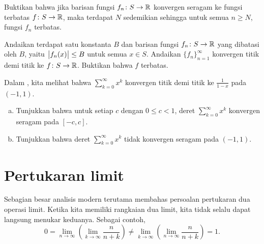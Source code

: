 \begin{exercise}
Buktikan bahwa
jika barisan fungsi $f_n \colon S \to {\mathbb{R}}$
konvergen seragam ke fungsi terbatas $f \colon S \to {\mathbb{R}}$,
maka terdapat $N$ sedemikian sehingga untuk semua $n \geq N$, fungsi $f_n$
terbatas.
\end{exercise}

\begin{exercise}
Andaikan terdapat satu konstanta $B$ dan
barisan fungsi
$f_n \colon S \to {\mathbb{R}}$ yang dibatasi oleh $B$,
yaitu $\bigl\lvert {f_n(x)} \bigr\rvert \leq B$ untuk semua $x \in S$.
Andaikan $\{ f_n \}_{n=1}^\infty$ konvergen titik demi titik
ke $f \colon S \to {\mathbb{R}}$.
Buktikan bahwa $f$ terbatas.
\end{exercise}

\begin{exercise}
Dalam , kita melihat bahwa
$\sum_{k=0}^\infty x^k$ konvergen titik demi titik ke $\frac{1}{1-x}$ pada
$(-1,1)$.
\begin{enumerate}[a)]
\item
Tunjukkan bahwa untuk setiap $c$ dengan $0 \leq c < 1$, deret
$\sum_{k=0}^\infty x^k$ konvergen seragam pada $[-c,c]$.
\item
Tunjukkan bahwa deret $\sum_{k=0}^\infty x^k$ tidak konvergen seragam
pada $(-1,1)$.
\end{enumerate}
\end{exercise}


\sectionnewpage
\section{Pertukaran limit}
\label{sec:liminter}



Sebagian besar analisis modern terutama membahas persoalan
pertukaran dua operasi limit.  Ketika
kita memiliki rangkaian dua limit, kita tidak selalu dapat langsung menukar keduanya.
Sebagai contoh,
\begin{equation*}
0 = 
\lim_{n\to\infty}
\left(
\lim_{k\to\infty}
\frac{n}{n + k}
\right)
\neq
\lim_{k\to\infty}
\left(
\lim_{n\to\infty}
\frac{n}{n + k}
\right)
= 1 .
\end{equation*}


